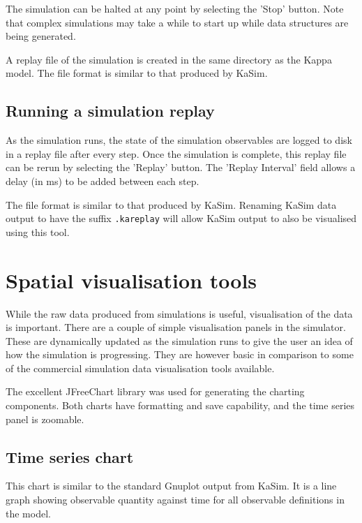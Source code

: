 The simulation can be halted at any point by selecting the 'Stop' button. Note that complex simulations may take a while to start up while data structures are being generated.

A replay file of the simulation is created in the same directory as the Kappa model. The file format is similar to that produced by KaSim.

\subsection{Running a simulation replay}

As the simulation runs, the state of the simulation observables are logged to disk in a replay file after every step. Once the simulation is complete, this replay file can be rerun by selecting the 'Replay' button. The 'Replay Interval' field allows a delay (in ms) to be added between each step.

The file format is similar to that produced by KaSim. Renaming KaSim data output to have the suffix \verb|.kareplay| will allow KaSim output to also be visualised using this tool.

\section{Spatial visualisation tools}

While the raw data produced from simulations is useful, visualisation of the data is important. There are a couple of simple visualisation panels in the simulator. These are dynamically updated as the simulation runs to give the user an idea of how the simulation is progressing. They are however basic in comparison to some of the commercial simulation data visualisation tools available.

The excellent JFreeChart \citep{JFreeChartwebsite} library was used for generating the charting components. Both charts have formatting and save capability, and the time series panel is zoomable.

\subsection{Time series chart}

This chart is similar to the standard Gnuplot output from KaSim. It is a line graph showing observable quantity against time for all observable definitions in the model.

